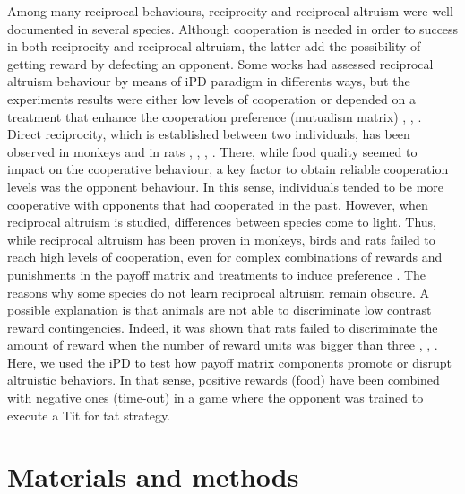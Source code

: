 \documentclass[10pt,letterpaper]{article}
\begin{document}
Among many reciprocal behaviours, reciprocity and reciprocal altruism were well documented in several species. Although cooperation is needed in order to success in both reciprocity and reciprocal altruism, the latter add the possibility of getting reward by defecting an opponent. Some works had assessed reciprocal altruism behaviour by means of iPD paradigm in differents ways, but the experiments results were either low levels of cooperation \cite{wood2016cooperation} or depended on a treatment that enhance the cooperation preference (mutualism matrix) \cite{stephens2002discounting}, \cite{kefi2007accumulated}, \cite{st2009long}.  Direct reciprocity, which is established between two individuals, has been observed in monkeys \cite{de2000attitudinal} \cite{mendres2000capuchins} \cite{hauser2003give} and in rats \cite{rutte2007generalized}, \cite{rutte2008influence}, \cite{schneeberger2012reciprocal}, \cite{dolivo2015norway}. There, while food quality seemed to impact on the cooperative behaviour, a key factor to obtain reliable cooperation levels was the opponent behaviour. In this sense, individuals tended to be more cooperative with opponents that had cooperated in the past. However, when reciprocal altruism is studied, differences between species come to light. Thus, while reciprocal altruism has been proven in monkeys, birds and rats failed to reach high levels of cooperation, even for complex combinations of rewards and punishments in the payoff matrix and treatments to induce preference \cite{wood2016cooperation} \cite{green1995prisoner} \cite{st2009long} \cite{stephens2001adaptive} \cite{stephens2002discounting} \cite{gardner1984prisoner} \cite{viana2010cognitive}.
The reasons why some species do not learn reciprocal altruism remain obscure. A possible explanation is that animals are not able to discriminate low contrast reward contingencies. Indeed, it was shown that rats failed to discriminate the amount of reward when the number of reward units was bigger than three \cite{capaldi1988counting}, \cite{killeen1982incentive}, \cite{killeen1985incentive}.
Here, we used the iPD to test how payoff  matrix components promote or disrupt altruistic behaviors. In that sense, positive rewards (food) have been combined with negative ones (time-out) in a game where the opponent was trained to execute a Tit for tat strategy.


\section*{Materials and methods}
\end{document}
